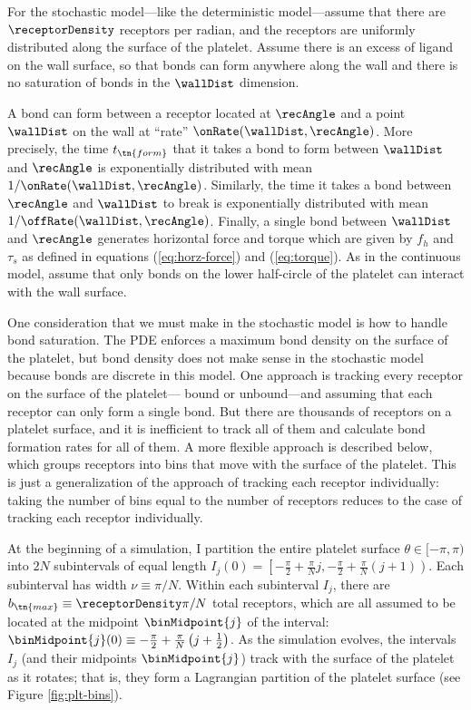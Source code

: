 For the stochastic model---like the deterministic model---assume that
there are $\receptorDensity$ receptors per radian, and the receptors
are uniformly distributed along the surface of the platelet. Assume
there is an excess of ligand on the wall surface, so that bonds can
form anywhere along the wall and there is no saturation of bonds in
the $\wallDist$ dimension.

A bond can form between a receptor located at $\recAngle$ and a point
$\wallDist$ on the wall at ``rate'' $\onRate(\wallDist,
\recAngle)$. More precisely, the time $t_\tn{form}$ that it takes a
bond to form between $\wallDist$ and $\recAngle$ is exponentially
distributed with mean $1/\onRate(\wallDist, \recAngle)$. Similarly,
the time it takes a bond between $\recAngle$ and $\wallDist$ to break
is exponentially distributed with mean
$1/\offRate(\wallDist, \recAngle)$. Finally, a single bond between
$\wallDist$ and $\recAngle$ generates horizontal force and torque
which are given by $f_h$ and $\tau_s$ as defined in equations
(\ref{eq:horz-force}) and (\ref{eq:torque}). As in the continuous
model, assume that only bonds on the lower half-circle of the platelet
can interact with the wall surface.

One consideration that we must make in the stochastic model is how to
handle bond saturation. The PDE enforces a maximum bond density on the
surface of the platelet, but bond density does not make sense in the
stochastic model because bonds are discrete in this model. One
approach is tracking every receptor on the surface of the platelet---
bound or unbound---and assuming that each receptor can only form a
single bond. But there are thousands of receptors on a platelet
surface, and it is inefficient to track all of them and calculate bond
formation rates for all of them. A more flexible approach is described
below, which groups receptors into bins that move with the surface of
the platelet. This is just a generalization of the approach of
tracking each receptor individually: taking the number of bins
equal to the number of receptors reduces to the case of tracking each
receptor individually.

At the beginning of a simulation, I partition the entire platelet
surface $\theta \in [-\pi, \pi)$ into $2N$ subintervals of equal
length
$I_j(0) = \left[-\frac{\pi}{2} + \frac{\pi}{N}j, -\frac{\pi}{2} +
  \frac{\pi}{N} (j+1)\right)$. Each subinterval has width
$\nu \equiv \pi/N$. Within each subinterval $I_j$, there are
$b_\tn{max} \equiv \receptorDensity \pi/N$ total receptors, which are
all assumed to be located at the midpoint $\binMidpoint{j}$ of the
interval:
$\binMidpoint{j}(0) \equiv -\frac{\pi}{2} + \frac{\pi}{N} \left( j +
  \frac{1}{2} \right)$. As the simulation evolves, the intervals $I_j$
(and their midpoints $\binMidpoint{j}$) track with the surface of the
platelet as it rotates; that is, they form a Lagrangian partition of
the platelet surface (see Figure \ref{fig:plt-bins}).

